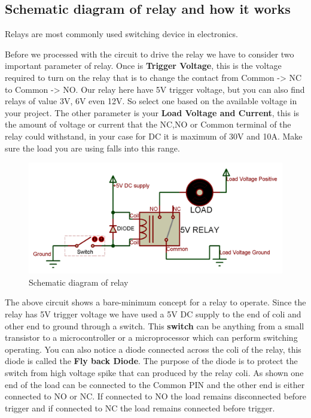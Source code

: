 \documentclass[a4paper]{report}
\begin{document}
    \subsection{Schematic diagram of relay and how it works}
        Relays are most commonly used switching device in electronics. 
        \linebreak
        \par Before we processed with the circuit to drive the relay we have to consider two important parameter of relay. 
        Once is \textbf{Trigger Voltage}, this is the voltage required to turn on the relay that is to change 
        the contact from Common -> NC to Common -> NO. Our relay here have 5V trigger voltage, but you can 
        also find relays of value 3V, 6V even 12V. So select one based on the available voltage in your project. 
        The other parameter is your \textbf{Load Voltage and Current}, this is the amount of voltage or current 
        that the NC,NO or Common terminal of the relay could withstand, in your case for DC it is maximum 
        of 30V and 10A. Make sure the load you are using falls into this range.
        \linebreak
        \begin{figure}[ht]
            \centering
            \includegraphics[width=\linewidth]{relay-working.png}
            \caption{\label{fig:boat}Schematic diagram of relay}
        \end{figure}
        \linebreak
        \par The above circuit shows a bare-minimum concept for a relay to operate. Since the relay 
        has 5V trigger voltage we have used a 5V DC supply to the end of coli and other end to ground 
        through a switch. This \textbf{switch} can be anything from a small transistor to a microcontroller 
        or a microprocessor which can perform switching operating. You can also notice a diode connected 
        across the coli of the relay, this diode is called the \textbf{Fly back Diode}. The purpose 
        of the diode is to protect the switch from high voltage spike that can produced by the relay coli. 
        As shown one end of the load can be connected to the Common PIN and the other end is either connected 
        to NO or NC. If connected to NO the load remains disconnected before trigger and if connected 
        to NC the load remains connected before trigger.
\end{document}
